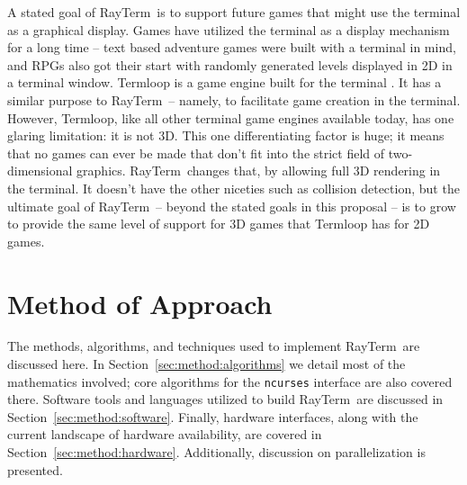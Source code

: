 \documentclass[11pt]{article}
\newcommand{\name}{{\sc RayTerm}}
\begin{document}
A stated goal of \name\ is to support future games that might use the terminal as a graphical display.
Games have utilized the terminal as a display mechanism for a long time -- text based adventure games were built with a terminal in mind, and RPGs also got their start with randomly generated levels displayed in 2D in a terminal window.
Termloop is a game engine built for the terminal \cite{termloop}.
It has a similar purpose to \name\ -- namely, to facilitate game creation in the terminal.
However, Termloop, like all other terminal game engines available today, has one glaring limitation: it is not 3D.
This one differentiating factor is huge; it means that no games can ever be made that don't fit into the strict field of two-dimensional graphics.
\name\ changes that, by allowing full 3D rendering in the terminal.
It doesn't have the other niceties such as collision detection, but the ultimate goal of \name\ -- beyond the stated goals in this proposal -- is to grow to provide the same level of support for 3D games that Termloop has for 2D games.


\section{Method of Approach}
\label{sec:method}


The methods, algorithms, and techniques used to implement \name\ are discussed here.
In Section~\ref{sec:method:algorithms} we detail most of the mathematics involved; core algorithms for the \texttt{ncurses} interface are also covered there.
Software tools and languages utilized to build \name\ are discussed in Section~\ref{sec:method:software}.
Finally, hardware interfaces, along with the current landscape of hardware availability, are covered in Section~\ref{sec:method:hardware}.
Additionally, discussion on parallelization is presented.
\end{document}
